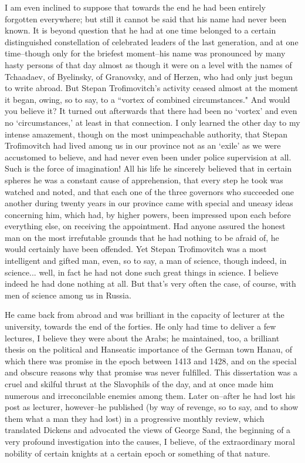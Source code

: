 \documentclass[12pt]{article}
\begin{document}
\vspace{12pt}
I am even inclined to suppose that towards the end he had been entirely
forgotten everywhere; but still it cannot be said that his name had
never been known. It is beyond question that he had at one time belonged
to a certain distinguished constellation of celebrated leaders of
the last generation, and at one time--though only for the briefest
moment--his name was pronounced by many hasty persons of that day almost
as though it were on a level with the names of Tchaadaev, of Byelinsky,
of Granovsky, and of Herzen, who had only just begun to write abroad.
But Stepan Trofimovitch's activity ceased almost at the moment it began,
owing, so to say, to a ``vortex of combined circumstances." And would you
believe it? It turned out afterwards that there had been no `vortex' and
even no `circumstances,' at least in that connection. I only learned
the other day to my intense amazement, though on the most unimpeachable
authority, that Stepan Trofimovitch had lived among us in our province
not as an `exile' as we were accustomed to believe, and had never even
been under police supervision at all. Such is the force of imagination!
All his life he sincerely believed that in certain spheres he was a
constant cause of apprehension, that every step he took was watched
and noted, and that each one of the three governors who succeeded one
another during twenty years in our province came with special and uneasy
ideas concerning him, which had, by higher powers, been impressed upon
each before everything else, on receiving the appointment. Had anyone
assured the honest man on the most irrefutable grounds that he had
nothing to be afraid of, he would certainly have been offended. Yet
Stepan Trofimovitch was a most intelligent and gifted man, even, so to
say, a man of science, though indeed, in science... well, in fact he
had not done such great things in science. I believe indeed he had done
nothing at all. But that's very often the case, of course, with men of
science among us in Russia.


\vspace{12pt}
He came back from abroad and was brilliant in the capacity of lecturer
at the university, towards the end of the forties. He only had time
to deliver a few lectures, I believe they were about the Arabs; he
maintained, too, a brilliant thesis on the political and Hanseatic
importance of the German town Hanau, of which there was promise in the
epoch between 1413 and 1428, and on the special and obscure reasons
why that promise was never fulfilled. This dissertation was a cruel
and skilful thrust at the Slavophils of the day, and at once made him
numerous and irreconcilable enemies among them. Later on--after he had
lost his post as lecturer, however--he published (by way of revenge,
so to say, and to show them what a man they had lost) in a progressive
monthly review, which translated Dickens and advocated the views of
George Sand, the beginning of a very profound investigation into the
causes, I believe, of the extraordinary moral nobility of certain
knights at a certain epoch or something of that nature.
\end{document}
